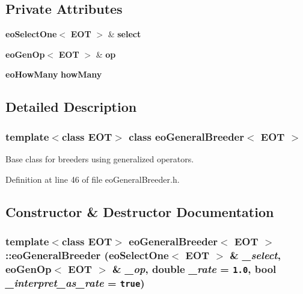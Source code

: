 \subsection*{Private Attributes}
\begin{CompactItemize}
\item 
{\bf eo\-Select\-One}$<$ {\bf EOT} $>$ \& {\bf select}\label{classeo_general_breeder_r0}

\item 
{\bf eo\-Gen\-Op}$<$ {\bf EOT} $>$ \& {\bf op}\label{classeo_general_breeder_r1}

\item 
{\bf eo\-How\-Many} {\bf how\-Many}\label{classeo_general_breeder_r2}

\end{CompactItemize}


\subsection{Detailed Description}
\subsubsection*{template$<$class EOT$>$ class eo\-General\-Breeder$<$ EOT $>$}

Base class for breeders using generalized operators. 



Definition at line 46 of file eo\-General\-Breeder.h.

\subsection{Constructor \& Destructor Documentation}
\subsubsection{\setlength{\rightskip}{0pt plus 5cm}template$<$class EOT$>$ {\bf eo\-General\-Breeder}$<$ {\bf EOT} $>$::{\bf eo\-General\-Breeder} ({\bf eo\-Select\-One}$<$ {\bf EOT} $>$ \& {\em \_\-select}, {\bf eo\-Gen\-Op}$<$ {\bf EOT} $>$ \& {\em \_\-op}, double {\em \_\-rate} = {\tt 1.0}, bool {\em \_\-interpret\_\-as\_\-rate} = {\tt true})\hspace{0.3cm}{\tt  [inline]}}\label{classeo_general_breeder_a0}


